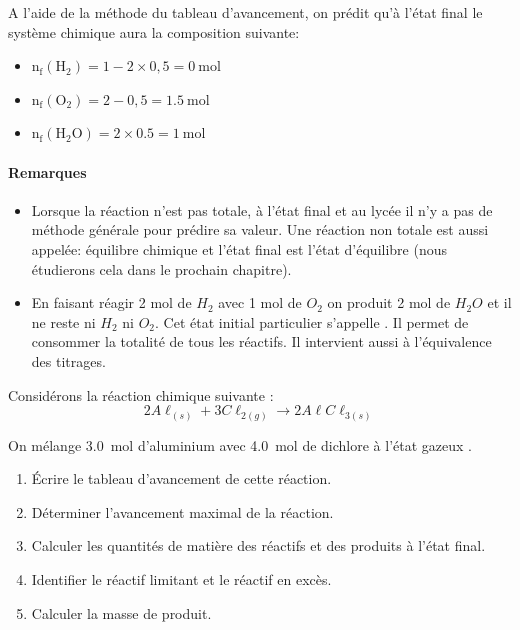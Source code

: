 A l'aide de la méthode du tableau d'avancement, on prédit qu'à l'état final le système chimique aura la composition suivante:
\begin{itemize}
	\item $\mathrm{n_f(H_2)}=1-2\times0,5=\SI{0}{\mole}$
	\item $\mathrm{n_f(O_2)}=2-0,5=\SI{1.5}{\mole}$
	\item $\mathrm{n_f(H_2O)}=2\times0.5=\SI{1}{\mole}$
\end{itemize}

\paragraph*{Remarques}
\begin{itemize}
	\item Lorsque la réaction n'est pas totale, à l'état final  et au lycée il n'y a pas de méthode générale pour prédire sa valeur. Une réaction non totale est aussi appelée: équilibre chimique et l'état final est l'état d'équilibre (nous étudierons cela dans le prochain chapitre).
	\item En faisant réagir 2 mol de $H_2$ avec 1 mol de $O_2$ on produit 2 mol de $H_2O$ et il ne reste ni $H_2$ ni $O_2$. Cet état initial particulier s'appelle . Il permet de consommer la totalité de tous les réactifs. Il intervient aussi à l'équivalence des titrages.
\end{itemize}




Considérons la réaction chimique suivante :
 $$2 A\ell_{(s)} + 3 C\ell_{2(g)} \longrightarrow 2 A\ell C\ell_{3(s)}$$

On mélange \SI{3.0}{mol} d'aluminium avec \SI{4.0}{mol} de dichlore à l'état gazeux .

\begin{enumerate}
    \item Écrire le tableau d'avancement de cette réaction.
    \item Déterminer l'avancement maximal de la réaction.
    \item Calculer les quantités de matière des réactifs et des produits à l'état final.
    \item Identifier le réactif limitant et le réactif en excès.
    \item Calculer la masse de produit.
\end{enumerate}
 \newpage
 
